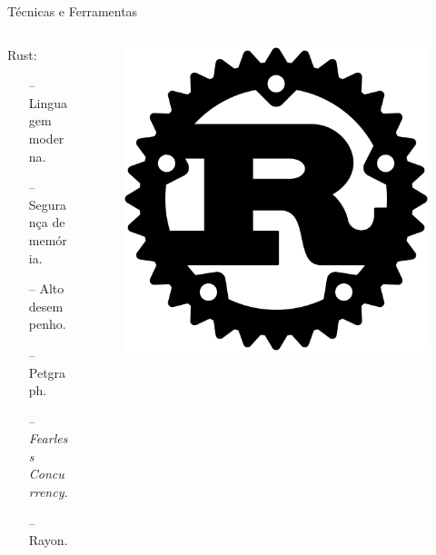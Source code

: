 \begin{frame}{Técnicas e Ferramentas}
    \begin{columns}
    \begin{column}{0.9\textwidth}
    Rust:
    \begin{itemize}
        \item[--] Linguagem moderna.
        \item[--] Segurança de memória.
        \item[--] Alto desempenho. 
        \item[--] Petgraph.
        \item[--] \textit{Fearless Concurrency}.
        \item[--] Rayon.
    \end{itemize}
    \end{column}

    \begin{column}{0.1\textwidth}
        \begin{figure}
            \includegraphics[width=\textwidth]{Figuras/Rust Logo.svg.png}
        \end{figure}
    \end{column}
    \end{columns}
\end{frame}


